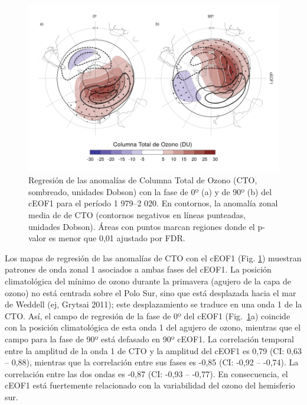 \documentclass[12pt,oneside,a4paper]{reedthesis}
\begin{document}
\begin{figure}

{\centering \includegraphics{figures/20-ceofs/o3-regr-1} 

}

\caption{Regresión de las anomalías de Columna Total de Ozono (CTO, sombreado, unidades Dobson) con la fase de 0º (a) y de 90º (b) del cEOF1 para el período 1 979--2 020. En contornos, la anomalía zonal media de de CTO (contornos negativos en líneas punteadas, unidades Dobson). Áreas con puntos marcan regiones donde el p-valor es menor que 0,01 ajustado por FDR.}\label{fig:o3-regr}
\end{figure}



Los mapas de regresión de las anomalías de CTO con el cEOF1 (Fig. \ref{fig:o3-regr}) muestran patrones de onda zonal 1 asociados a ambas fases del cEOF1.
La posición climatológica del mínimo de ozono durante la primavera (agujero de la capa de ozono) no está centrada sobre el Polo Sur, sino que está desplazada hacia el mar de Weddell (ej, Grytsai 2011); este desplazamiento se traduce en una onda 1 de la CTO.
Así, el campo de regresión de la fase de 0º del cEOF1 (Fig.~\ref{fig:o3-regr}a) coincide con la posición climatológica de esta onda 1 del agujero de ozono, mientras que el campo para la fase de 90º está defasado en 90º cEOF1.
La correlación temporal entre la amplitud de la onda 1 de CTO y la amplitud del cEOF1 es 0,79 (CI: 0,63 -- 0,88), mientras que la correlación entre sus fases es -0,85 (CI: -0,92 -- -0,74).
La correlación entre las dos ondas es -0,87 (CI: -0,93 -- -0,77).
En consecuencia, el cEOF1 está fuertemente relacionado con la variabilidad del ozono del hemisferio sur.
\end{document}
